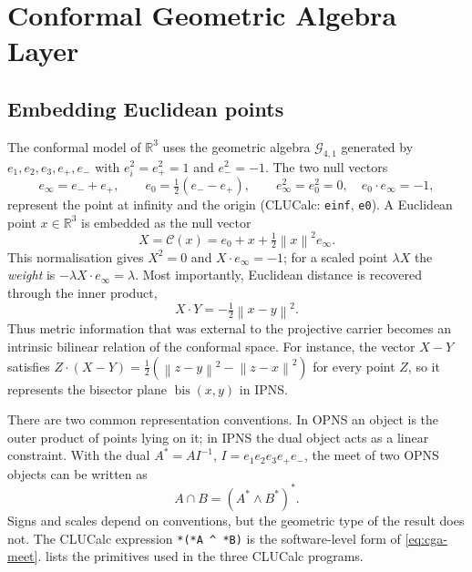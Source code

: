 \documentclass[11pt,a4paper]{article}
\theoremstyle{plain}
\theoremstyle{definition}
\theoremstyle{remark}
\newcommand{\R}{\mathbb{R}}
\newcommand{\GA}{\mathcal{G}_{4,1}}
\newcommand{\einf}{e_{\infty}}
\newcommand{\ezero}{e_{0}}
\newcommand{\norm}[1]{\left\lVert#1\right\rVert}
\newcommand{\bis}{\operatorname{bis}}
\begin{document}
\FloatBarrier

\section{Conformal Geometric Algebra Layer}\label{sec:cga}

\subsection{Embedding Euclidean points}

The conformal model of $\R^3$ uses the geometric algebra $\GA$ generated by
$e_1,e_2,e_3,e_{+},e_{-}$ with $e_i^2=e_{+}^2=1$ and $e_{-}^2=-1$. The two null
vectors
\begin{equation}
  \einf=e_{-}+e_{+},\qquad \ezero=\tfrac12(e_{-}-e_{+}),
  \qquad
  \einf^2=\ezero^2=0,\quad \ezero\cdot\einf=-1,
\end{equation}
represent the point at infinity and the origin (CLUCalc: \texttt{einf},
\texttt{e0}). A Euclidean point $x\in\R^3$ is embedded as the null vector
\begin{equation}
  X=\mathcal{C}(x)=\ezero+x+\tfrac{1}{2}\norm{x}^2\einf .
  \label{eq:conformal-embedding}
\end{equation}
This normalisation gives $X^2=0$ and $X\cdot\einf=-1$; for a scaled point
$\lambda X$ the \emph{weight} is $-\lambda X\cdot\einf=\lambda$. Most
importantly, Euclidean distance is recovered through the inner product,
\begin{equation}
  X\cdot Y=-\tfrac{1}{2}\norm{x-y}^2 .
  \label{eq:cga-distance}
\end{equation}
Thus metric information that was external to the projective carrier becomes an
intrinsic bilinear relation of the conformal space. For instance, the vector
$X-Y$ satisfies $Z\cdot(X-Y)=\frac12(\norm{z-y}^2-\norm{z-x}^2)$ for every point
$Z$, so it represents the bisector plane $\bis(x,y)$ in IPNS.

There are two common representation conventions. In OPNS an object is the outer
product of points lying on it; in IPNS the dual object acts as a linear
constraint. With the dual $A^*=AI^{-1}$, $I=e_1e_2e_3e_{+}e_{-}$, the meet of two
OPNS objects can be written as
\begin{equation}
  A\cap B=\left(A^*\wedge B^*\right)^* .
  \label{eq:cga-meet}
\end{equation}
Signs and scales depend on conventions, but the geometric type of the result
does not. The CLUCalc expression \texttt{*(*A \^{} *B)} is the software-level
form of \cref{eq:cga-meet}.  lists the primitives used
in the three CLUCalc programs.
\end{document}
